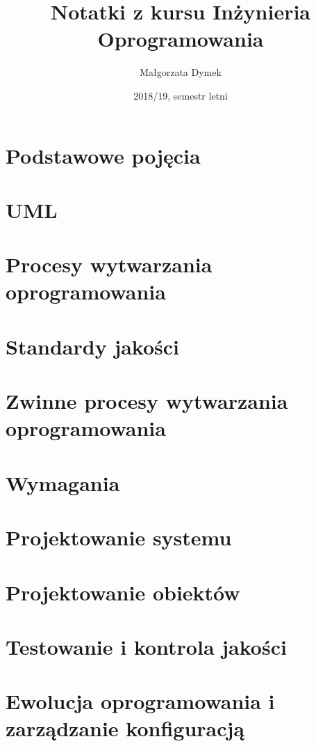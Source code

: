 \documentclass[a4paper]{article}
\title{Notatki z kursu Inżynieria Oprogramowania}
\author{Małgorzata Dymek}
\date{2018/19, semestr letni}
\begin{document}
    \maketitle

    \section{Podstawowe pojęcia}
    

    \section {UML}
    


    \section{Procesy wytwarzania oprogramowania}
    


    \section{Standardy jakości}
    

    \section{Zwinne procesy wytwarzania oprogramowania}
    


    \section{Wymagania}
    

    \section{Projektowanie systemu}
    

    \section{Projektowanie obiektów}
    

    \section{Testowanie i kontrola jakości}
    


    \section{Ewolucja oprogramowania i zarządzanie konfiguracją}
    
\end{document}
